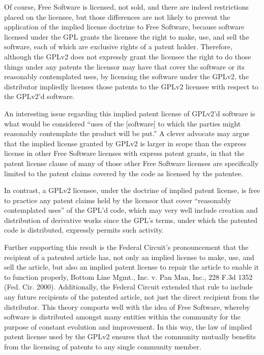 Of course, Free Software is licensed, not sold, and there are indeed
restrictions placed on the licensee, but those differences are not likely
to prevent the application of the implied license doctrine to Free
Software, because software licensed under the GPL grants the licensee the
right to make, use, and sell the software, each of which are exclusive
rights of a patent holder. Therefore, although the GPLv2 does not expressly
grant the licensee the right to do those things under any patents the
licensor may have that cover the software or its reasonably contemplated
uses, by licensing the software under the GPLv2, the distributor impliedly
licenses those patents to the GPLv2 licensee with respect to the GPLv2'd
software.

An interesting issue regarding this implied patent license of GPLv2'd
software is what would be considered ``uses of the [software] to which
the parties might reasonably contemplate the product will be put.'' A
clever advocate may argue that the implied license granted by GPLv2 is
larger in scope than the express license in other Free Software
licenses with express patent grants, in that the patent license
clause of many of those other Free  Software licenses are specifically 
limited to the patent claims covered by the code as licensed by the patentee.

In contrast, a GPLv2 licensee, under the doctrine of implied patent license, 
is free to practice any patent claims held by the licensor that cover 
``reasonably contemplated uses'' of the GPL'd code, which may very well 
include creation and distribution of derivative works since the GPL's terms, 
under which the patented code is distributed, expressly permits such activity.


Further supporting this result is the Federal Circuit's pronouncement that
the recipient of a patented article has, not only an implied license to
make, use, and sell the article, but also an implied patent license to
repair the article to enable it to function properly, Bottom Line Mgmt.,
Inc. v. Pan Man, Inc., 228 F.3d 1352 (Fed. Cir. 2000). Additionally, the
Federal Circuit extended that rule to include any future recipients of the
patented article, not just the direct recipient from the distributor.
This theory comports well with the idea of Free Software, whereby software
is distributed amongst many entities within the community for the purpose
of constant evolution and improvement. In this way, the law of implied
patent license used by the GPLv2 ensures that the community mutually
benefits from the licensing of patents to any single community member.




